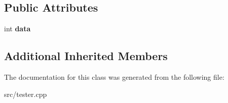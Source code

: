 \subsection*{Public Attributes}
\begin{DoxyCompactItemize}
\item 
\mbox{\label{classIntTreeNode_a5f70a55a2d93edfac804b5c69b374306}} 
int {\bfseries data}
\end{DoxyCompactItemize}
\subsection*{Additional Inherited Members}


The documentation for this class was generated from the following file\+:\begin{DoxyCompactItemize}
\item 
src/tester.\+cpp\end{DoxyCompactItemize}
